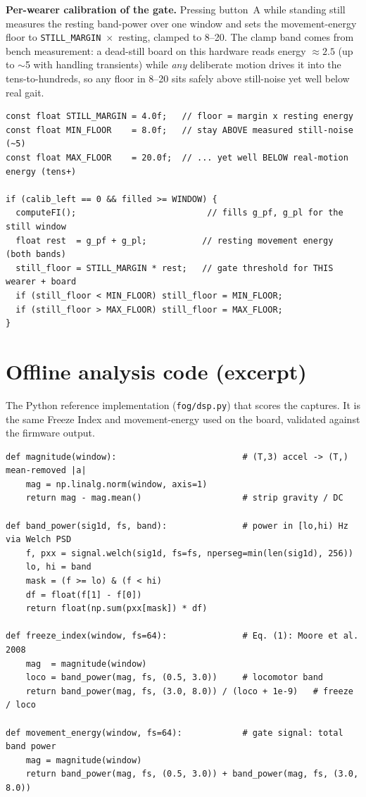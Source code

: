 \documentclass[11pt,a4paper]{article}
\begin{document}
\textbf{Per-wearer calibration of the gate.} Pressing button~A while standing still
measures the resting band-power over one window and sets the movement-energy floor to
\texttt{STILL\_MARGIN}~$\times$~resting, clamped to \numrange{8}{20}. The clamp band
comes from bench measurement: a dead-still board on this hardware reads energy
$\approx 2.5$ (up to $\sim$5 with handling transients) while \emph{any} deliberate
motion drives it into the tens-to-hundreds, so any floor in \numrange{8}{20} sits
safely above still-noise yet well below real gait.

\begin{lstlisting}[style=cpp,caption={Button-A calibration of the movement-energy floor (cpx\_fog\_standalone.ino).}]
const float STILL_MARGIN = 4.0f;   // floor = margin x resting energy
const float MIN_FLOOR    = 8.0f;   // stay ABOVE measured still-noise (~5)
const float MAX_FLOOR    = 20.0f;  // ... yet well BELOW real-motion energy (tens+)

if (calib_left == 0 && filled >= WINDOW) {
  computeFI();                          // fills g_pf, g_pl for the still window
  float rest  = g_pf + g_pl;           // resting movement energy (both bands)
  still_floor = STILL_MARGIN * rest;   // gate threshold for THIS wearer + board
  if (still_floor < MIN_FLOOR) still_floor = MIN_FLOOR;
  if (still_floor > MAX_FLOOR) still_floor = MAX_FLOOR;
}
\end{lstlisting}

\section{Offline analysis code (excerpt)}
\label{app:dsp}

The Python reference implementation (\texttt{fog/dsp.py}) that scores the captures.
It is the same Freeze Index and movement-energy used on the board, validated against
the firmware output.

\begin{lstlisting}[style=py,caption={Freeze Index and movement-energy (fog/dsp.py).}]
def magnitude(window):                         # (T,3) accel -> (T,) mean-removed |a|
    mag = np.linalg.norm(window, axis=1)
    return mag - mag.mean()                    # strip gravity / DC

def band_power(sig1d, fs, band):               # power in [lo,hi) Hz via Welch PSD
    f, pxx = signal.welch(sig1d, fs=fs, nperseg=min(len(sig1d), 256))
    lo, hi = band
    mask = (f >= lo) & (f < hi)
    df = float(f[1] - f[0])
    return float(np.sum(pxx[mask]) * df)

def freeze_index(window, fs=64):               # Eq. (1): Moore et al. 2008
    mag  = magnitude(window)
    loco = band_power(mag, fs, (0.5, 3.0))     # locomotor band
    return band_power(mag, fs, (3.0, 8.0)) / (loco + 1e-9)   # freeze / loco

def movement_energy(window, fs=64):            # gate signal: total band power
    mag = magnitude(window)
    return band_power(mag, fs, (0.5, 3.0)) + band_power(mag, fs, (3.0, 8.0))
\end{lstlisting}
\end{document}
